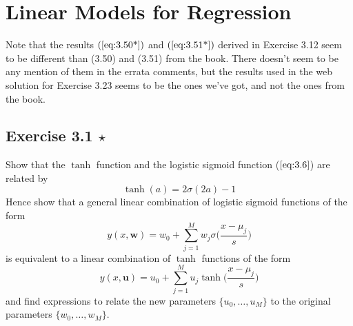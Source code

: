 \chapter{Linear Models for Regression}

Note that the results $(\ref{eq:3.50*})$ and $(\ref{eq:3.51*})$ 
derived in Exercise 3.12 seem to be different than (3.50) and (3.51)
from the book. There doesn't seem to be any mention of them in the 
errata comments, but the results used in the web solution for 
Exercise 3.23 seems to be the ones we've got, and not the ones from the book.

\section*{Exercise 3.1 $\star$}
Show that the $\tanh$ function and the logistic
sigmoid function ($\ref{eq:3.6}$) are related by 
\begin{equation*}
    \tanh(a) = 2\sigma(2a) - 1
    \tag{3.100}\label{eq:3.100}
\end{equation*}
Hence show that a general linear combination of logistic sigmoid functions
of the form
\begin{equation*}
    y(x, \mathbf{w}) = w_0 + \sum_{j=1}^{M} w_j \sigma\bigg(\frac{x-\mu_j}{s}\bigg)
    \tag{3.101}\label{eq:3.101}
\end{equation*}
is equivalent to a linear combination of $\tanh$ functions of the form
\begin{equation*}
    y(x, \mathbf{u}) = u_0 + \sum_{j=1}^{M} u_j \tanh\bigg(\frac{x-\mu_j}{s}\bigg)
    \tag{3.102}\label{eq:3.102}
\end{equation*}
and find expressions to relate the new parameters $\{u_0, \ldots, u_M\}$
to the original parameters \linebreak $\{w_0, \ldots, w_M\}$.

\vspace{1em}

